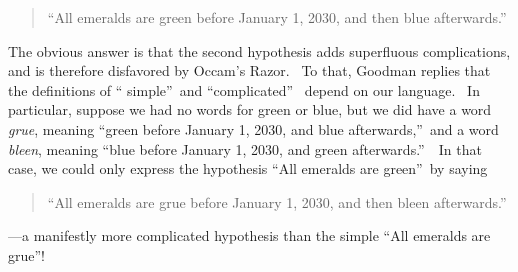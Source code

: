\documentclass[11pt,onecolumn]{article}%
\begin{document}
\begin{quotation}
\noindent\textquotedblleft All emeralds are green before January 1, 2030, and
then blue afterwards.\textquotedblright
\end{quotation}

The obvious answer is that the second hypothesis adds superfluous
complications, and is therefore disfavored by Occam's Razor. \ To that,
Goodman replies that the definitions of \textquotedblleft
simple\textquotedblright\ and \textquotedblleft complicated\textquotedblright%
\ depend on our language. \ In particular, suppose we had no words for green
or blue, but we did have a word \textit{grue}, meaning \textquotedblleft green
before January 1, 2030, and blue afterwards,\textquotedblright\ and a word
\textit{bleen}, meaning \textquotedblleft blue before January 1, 2030, and
green afterwards.\textquotedblright\ \ In that case, we could only express the
hypothesis \textquotedblleft All emeralds are green\textquotedblright\ by saying

\begin{quotation}
\noindent\textquotedblleft All emeralds are grue before January 1, 2030, and
then bleen afterwards.\textquotedblright
\end{quotation}

\noindent---a manifestly more complicated hypothesis than the simple
\textquotedblleft All emeralds are grue\textquotedblright!
\end{document}

